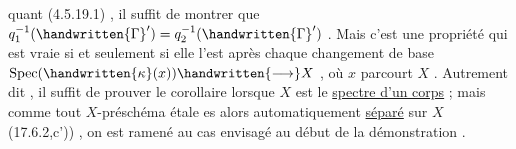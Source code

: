 quant (4.5.19.1) , il suffit de montrer que $q_1^{-1}(\handwritten{\Gamma}')=q_2^{-1}(\handwritten{\Gamma}')$ . Mais
c'est une propriété  qui est vraie si  et seulement
si elle l'est après chaque changement de base $\operatorname{Spec}(\handwritten{\kappa}(x))\handwritten{\longrightarrow}X$ , où
$x$ parcourt $X$ . Autrement dit , il suffit de prouver le corollaire lorsque
$X$ est le \uline{spectre d'un corps} ; mais comme tout $X$-préschéma étale es
alors automatiquement \uline{séparé} sur $X$ (17.6.2,c')) , on est ramené au cas
envisagé au début de la démonstration .
